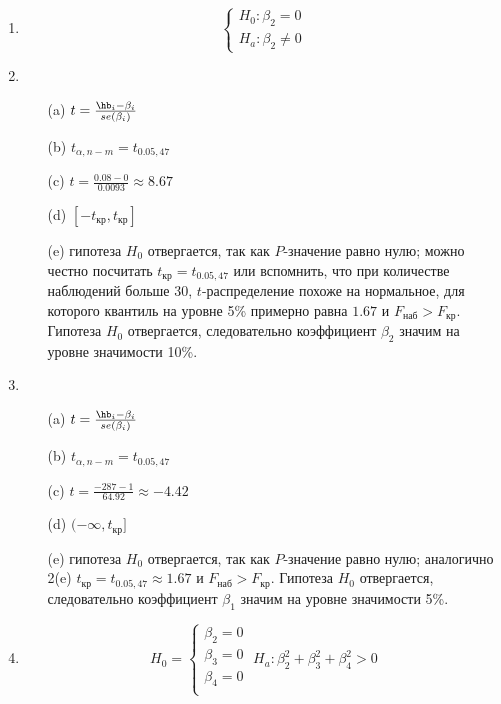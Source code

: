 \documentclass[pdftex,11pt,openany]{book}\usepackage[]{graphicx}\usepackage[]{color}
\begin{document}
\begin{solution}
\begin{enumerate}
\item
\[
\begin{cases}
H_0: \beta_2=0\\
H_a: \beta_2\neq 0
\end{cases}
\]

\item 
\begin{enumerate}
\item[(a)] $t=\frac{\hb_i-\beta_i}{se(\beta_i)}$
\item[(b)] $t_{\alpha,n-m}=t_{0.05,47}$
\item[(c)] $t=\frac{0.08-0}{0.0093}\approx 8.67$
\item[(d)]$[-t_{\text{кр}},t_{\text{кр}}]$
\item[(e)] гипотеза $H_0$ отвергается, так как $P$-значение равно нулю; можно честно посчитать $t_{\text{кр}}=t_{0.05,47}$ или вспомнить, что при количестве наблюдений больше 30, $t$-распределение похоже на нормальное, для которого квантиль на уровне 5\% примерно равна $1.67$ и $F_{\text{наб}}>F_{\text{кр}}$. Гипотеза $H_0$ отвергается, следовательно коэффициент $\beta_2$ значим на уровне значимости 10\%.
\end{enumerate}

\item 
\begin{enumerate}
\item[(a)] $t=\frac{\hb_i-\beta_i}{se(\beta_i)}$
\item[(b)] $t_{\alpha,n-m}=t_{0.05,47}$
\item[(c)] $t=\frac{-287-1}{64.92}\approx -4.42$
\item[(d)]$(-\infty,t_{\text{кр}}]$
\item[(e)] гипотеза $H_0$ отвергается, так как $P$-значение равно нулю; аналогично 2(e) $t_{\text{кр}}=t_{0.05,47}\approx 1.67$ и $F_{\text{наб}}>F_{\text{кр}}$. Гипотеза $H_0$ отвергается, следовательно коэффициент $\beta_1$ значим на уровне значимости 5\%.
\end{enumerate}

\item 
\[
H_0=
\begin{cases}
\beta_2=0\\
\beta_3=0\\
\beta_4=0\\
\end{cases}
\;
H_a:\beta_2^2+\beta_3^2+\beta_4^2>0 
\]


\end{enumerate}
\end{solution}
\end{document}
